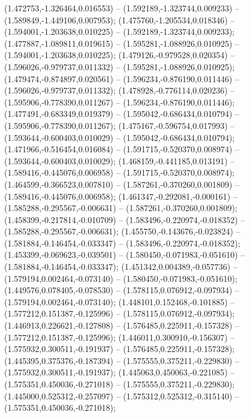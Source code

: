  (1.472753,-1.326464,0.016553) -- (1.592189,-1.323744,0.009233) -- (1.589849,-1.449106,0.007953);
 (1.475760,-1.205534,0.018346) -- (1.594001,-1.203638,0.010225) -- (1.592189,-1.323744,0.009233);
 (1.477887,-1.089811,0.019615) -- (1.595281,-1.088926,0.010925) -- (1.594001,-1.203638,0.010225);
 (1.479126,-0.979528,0.020354) -- (1.596026,-0.979737,0.011332) -- (1.595281,-1.088926,0.010925);
 (1.479474,-0.874897,0.020561) -- (1.596234,-0.876190,0.011446) -- (1.596026,-0.979737,0.011332);
 (1.478928,-0.776114,0.020236) -- (1.595906,-0.778390,0.011267) -- (1.596234,-0.876190,0.011446);
 (1.477491,-0.683349,0.019379) -- (1.595042,-0.686434,0.010794) -- (1.595906,-0.778390,0.011267);
 (1.475167,-0.596754,0.017993) -- (1.593644,-0.600403,0.010029) -- (1.595042,-0.686434,0.010794);
 (1.471966,-0.516454,0.016084) -- (1.591715,-0.520370,0.008974) -- (1.593644,-0.600403,0.010029);
 (1.468159,-0.441185,0.013191) -- (1.589416,-0.445076,0.006958) -- (1.591715,-0.520370,0.008974);
 (1.464599,-0.366523,0.007810) -- (1.587261,-0.370260,0.001809) -- (1.589416,-0.445076,0.006958);
 (1.461347,-0.292081,-0.000161) -- (1.585288,-0.295567,-0.006631) -- (1.587261,-0.370260,0.001809);
 (1.458399,-0.217814,-0.010709) -- (1.583496,-0.220974,-0.018352) -- (1.585288,-0.295567,-0.006631);
 (1.455750,-0.143676,-0.023824) -- (1.581884,-0.146454,-0.033347) -- (1.583496,-0.220974,-0.018352);
 (1.453399,-0.069623,-0.039501) -- (1.580450,-0.071983,-0.051610) -- (1.581884,-0.146454,-0.033347);
 (1.451342,0.004389,-0.057736) -- (1.579194,0.002464,-0.073140) -- (1.580450,-0.071983,-0.051610);
 (1.449576,0.078405,-0.078530) -- (1.578115,0.076912,-0.097934) -- (1.579194,0.002464,-0.073140);
 (1.448101,0.152468,-0.101885) -- (1.577212,0.151387,-0.125996) -- (1.578115,0.076912,-0.097934);
 (1.446913,0.226621,-0.127808) -- (1.576485,0.225911,-0.157328) -- (1.577212,0.151387,-0.125996);
 (1.446011,0.300910,-0.156307) -- (1.575932,0.300511,-0.191937) -- (1.576485,0.225911,-0.157328);
 (1.445395,0.375376,-0.187394) -- (1.575555,0.375211,-0.229830) -- (1.575932,0.300511,-0.191937);
 (1.445063,0.450063,-0.221085) -- (1.575351,0.450036,-0.271018) -- (1.575555,0.375211,-0.229830);
 (1.445000,0.525312,-0.257097) -- (1.575312,0.525312,-0.315140) -- (1.575351,0.450036,-0.271018);
